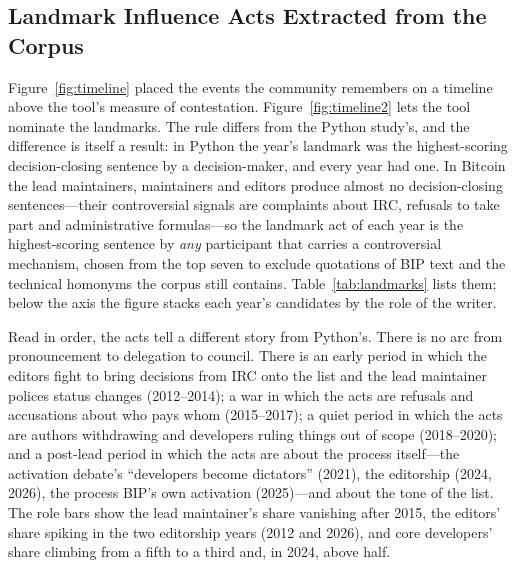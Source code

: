 \subsection{Landmark Influence Acts Extracted from the Corpus}
\label{sec:landmarks}

Figure~\ref{fig:timeline} placed the events the community remembers on a timeline above the tool's measure of contestation. Figure~\ref{fig:timeline2} lets the tool nominate the landmarks. The rule differs from the Python study's, and the difference is itself a result: in Python the year's landmark was the highest-scoring decision-closing sentence by a decision-maker, and every year had one. In Bitcoin the lead maintainers, maintainers and editors produce almost no decision-closing sentences---their controversial signals are complaints about IRC, refusals to take part and administrative formulas---so the landmark act of each year is the highest-scoring sentence by \emph{any} participant that carries a controversial mechanism, chosen from the top seven to exclude quotations of BIP text and the technical homonyms the corpus still contains. Table~\ref{tab:landmarks} lists them; below the axis the figure stacks each year's candidates by the role of the writer.

Read in order, the acts tell a different story from Python's. There is no arc from pronouncement to delegation to council. There is an early period in which the editors fight to bring decisions from IRC onto the list and the lead maintainer polices status changes (2012--2014); a war in which the acts are refusals and accusations about who pays whom (2015--2017); a quiet period in which the acts are authors withdrawing and developers ruling things out of scope (2018--2020); and a post-lead period in which the acts are about the process itself---the activation debate's ``developers become dictators'' (2021), the editorship (2024, 2026), the process BIP's own activation (2025)---and about the tone of the list. The role bars show the lead maintainer's share vanishing after 2015, the editors' share spiking in the two editorship years (2012 and 2026), and core developers' share climbing from a fifth to a third and, in 2024, above half.

